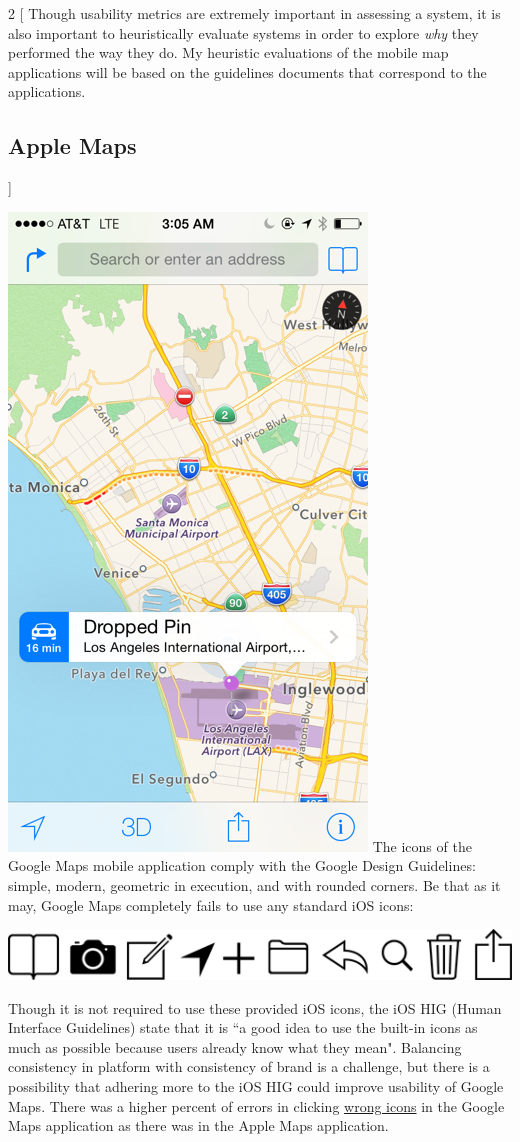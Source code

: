 \documentclass[a4paper; 11pt]{article}
\begin{document}
\clearpage
\begin{multicols}{2}
[
Though usability metrics are extremely important in assessing a system, it is also important to heuristically evaluate systems in order to explore \textit{why} they performed the way they do.
My heuristic evaluations of the mobile map applications will be based on the guidelines documents that correspond to the applications.
\subsection{Apple Maps}
]
\par
\noindent
\includegraphics[width=.49\textwidth]{apple-maps.png}
The icons of the Google Maps mobile application comply with the Google Design Guidelines\cite{Google}: simple, modern, geometric in execution, and with rounded corners. Be that as it may, Google Maps completely fails to use any standard iOS icons:
\par
\noindent
\includegraphics[width=.45\textwidth]{ios-bar-icons.png}
\par
\noindent
Though it is not required to use these provided iOS icons, the iOS HIG (Human Interface Guidelines) state that it is ``a good idea to use the built-in icons as much as possible because users already know what they mean".\cite{Apple} Balancing consistency in platform with consistency of brand is a challenge, but there is a possibility that adhering more to the iOS HIG could improve usability of Google Maps. There was a higher percent of errors in clicking \underline{wrong icons} in the Google Maps application as there was in the Apple Maps application. 




\end{multicols}
\clearpage
\end{document}
